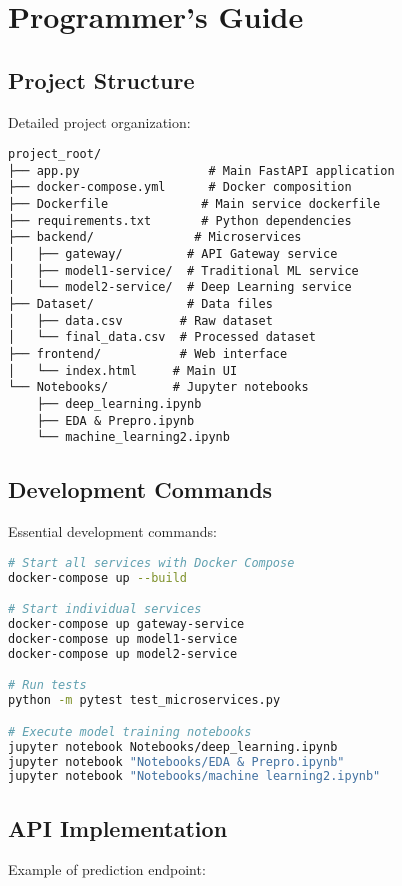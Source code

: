 \documentclass[12pt,a4paper]{report}
\begin{document}
\chapter{Programmer's Guide}

\section{Project Structure}
Detailed project organization:

\begin{verbatim}
project_root/
├── app.py                  # Main FastAPI application
├── docker-compose.yml      # Docker composition
├── Dockerfile             # Main service dockerfile
├── requirements.txt       # Python dependencies
├── backend/              # Microservices
│   ├── gateway/         # API Gateway service
│   ├── model1-service/  # Traditional ML service
│   └── model2-service/  # Deep Learning service
├── Dataset/             # Data files
│   ├── data.csv        # Raw dataset
│   └── final_data.csv  # Processed dataset
├── frontend/           # Web interface
│   └── index.html     # Main UI
└── Notebooks/         # Jupyter notebooks
    ├── deep_learning.ipynb
    ├── EDA & Prepro.ipynb
    └── machine_learning2.ipynb
\end{verbatim}

\section{Development Commands}
Essential development commands:

\begin{lstlisting}[language=bash]
# Start all services with Docker Compose
docker-compose up --build

# Start individual services
docker-compose up gateway-service
docker-compose up model1-service
docker-compose up model2-service

# Run tests
python -m pytest test_microservices.py

# Execute model training notebooks
jupyter notebook Notebooks/deep_learning.ipynb
jupyter notebook "Notebooks/EDA & Prepro.ipynb"
jupyter notebook "Notebooks/machine learning2.ipynb"
\end{lstlisting}

\section{API Implementation}
Example of prediction endpoint:
\end{document}
